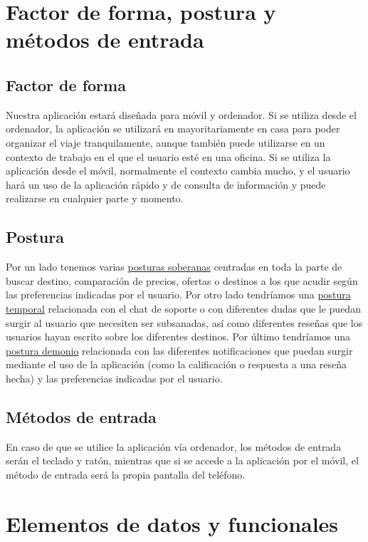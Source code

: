 \section{Factor de forma, postura y métodos de entrada}
\subsection{Factor de forma}
Nuestra aplicación estará diseñada para móvil y ordenador. Si se utiliza desde el ordenador, la aplicación se utilizará en mayoritariamente en casa para 
poder organizar el viaje  tranquilamente, aunque también puede utilizarse en un contexto de trabajo en el que el usuario esté en una oficina. Si se utiliza 
la aplicación desde el móvil, normalmente el contexto cambia mucho, y el usuario hará un uso de la aplicación rápido y de consulta de información y puede 
realizarse en cualquier parte y momento.

\subsection{Postura}
Por un lado tenemos varias \underline{posturas soberanas} centradas en toda la parte de buscar destino, comparación de precios, ofertas o destinos a los que acudir 
según las preferencias indicadas por el usuario. Por otro lado tendríamos una \underline{postura temporal} relacionada con el chat de soporte o con diferentes dudas 
que le puedan surgir al usuario que necesiten ser subsanadas, así como diferentes reseñas que los usuarios hayan escrito sobre los diferentes destinos. Por último 
tendríamos una \underline{postura demonio} relacionada con las diferentes notificaciones que puedan surgir mediante el uso de la aplicación (como la calificación o 
respuesta a una reseña hecha) y las preferencias indicadas por el usuario.

\subsection{Métodos de entrada}
En caso de que se utilice la aplicación vía ordenador, los métodos de entrada serán el teclado y ratón, mientras que si se accede a la aplicación por el móvil, 
el método de entrada será la propia pantalla del teléfono.

\section{Elementos de datos y funcionales}
